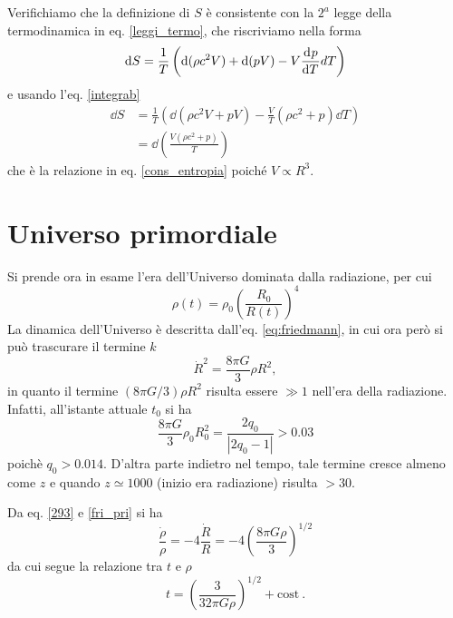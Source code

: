 Verifichiamo che la definizione di $S$ è consistente con la $2^a$ legge della
termodinamica in eq. \eqref{leggi_termo}, che riscriviamo nella forma
\begin{equation}
  \mathop{}\!\mathrm{d} S  = \frac{1}{T} \left( \mathop{}\!\mathrm{d}(\rho c^2 V) + \mathop{}\!\mathrm{d}(pV) - V \frac{{\mathop{}\!\mathrm{d}^{}}p}{\mathop{}\!\mathrm{d} {T}^{}} dT
  \right)
\end{equation}
e usando l'eq. \eqref{integrab}
\begin{equation}
  \begin{split}
    \dd S &= \frac{1}{T} \left( \dd(\rho c^2 V + pV) -  \frac{V}{T}   (\rho c^2
      +p) \dd T \right) \\
    &= \dd\left( \frac{V (\rho c^2 + p)} {T}  \right)
  \end{split}
\end{equation}
che è la relazione in eq. \eqref{cons_entropia} poiché $V \propto R^3$.

\section{Universo primordiale}

Si prende ora in esame l'era dell'Universo dominata dalla radiazione, per cui
\begin{equation}
  \rho(t)=\rho_0 \left(\frac{R_0}{R(t)} \right)^4
  \label{293}
\end{equation}
La dinamica dell'Universo è descritta dall'eq. \eqref{eq:friedmann}, in cui ora
però si può trascurare il termine $k$
\begin{equation}
  \dot{R}^2 = \frac{8 \pi G}{3} \rho R^2,
  \label{fri_pri}
\end{equation}
in quanto il termine $(8 \pi G /3) \rho R^2$ risulta essere $\gg 1$ nell'era
della radiazione.  Infatti, all'istante attuale $t_0$ si ha
\begin{equation}
  \frac{8 \pi G}{3} \rho_0 R^2_0 = \frac{2q_0}{|2q_0-1|} > 0.03
\end{equation}
poichè $q_0>0.014$.  D'altra parte indietro nel tempo, tale termine cresce
almeno come $z$ e quando $z\simeq 1000$ (inizio era radiazione) risulta $>30$.

Da eq. \eqref{293} e \eqref{fri_pri} si ha
\begin{equation}
  \frac{\dot \rho}{\rho} = -4 \frac{\dot R}{R} = - 4 \left( \frac{8 \pi G
      \rho}{3} \right)^{1/2}
\end{equation}
da cui segue la relazione tra $t$ e $\rho$
\begin{equation}
  t = \left( \frac{3}{32 \pi G \rho} \right)^{1/2} + \text{cost}\ .
  \label{tvsrho}
\end{equation}

